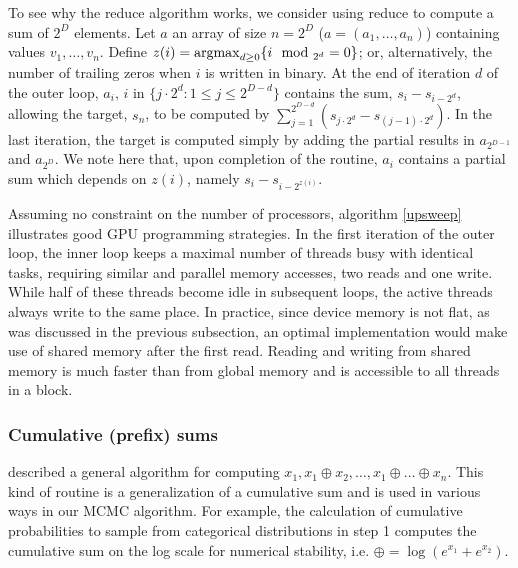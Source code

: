 To see why the reduce algorithm works, we consider using reduce to compute a sum of $2^D$ elements. Let $a$ an array of size $n=2^D$ ($a=(a_1,\ldots,a_n)$) containing values $v_1,\ldots,v_n$. Define $z(i)=\operatorname{argmax}_{d\ge 0}\{i \mod_{2^d} =0\}$; or, alternatively, the number of trailing zeros when $i$ is written in binary. At the end of iteration $d$ of the outer loop, $a_{i},\,i$ in $\{j\cdot 2^d: 1 \le j \le 2^{D-d}\}$ contains the sum, $s_{i}-s_{i-2^d}$, allowing the target, $s_n$, to be computed by $\sum_{j=1}^{2^{D-d}}(s_{j\cdot 2^d}-s_{(j-1)\cdot 2^d})$. In the last iteration, the target is computed simply by adding the partial results in $a_{2^{D-1}}$ and $a_{2^{D}}$. We note here that, upon completion of the routine, $a_i$ contains a partial sum which depends on $z(i)$, namely $s_i - s_{i-2^{z(i)}}$.

Assuming no constraint on the number of processors, algorithm \ref{upsweep} illustrates good GPU programming strategies. In the first iteration of the outer loop, the inner loop keeps a maximal number of threads busy with identical tasks, requiring similar and parallel memory accesses, two reads and one write. While half of these threads become idle in subsequent loops, the active threads always write to the same place. In practice, since device memory is not flat, as was discussed in the previous subsection, an optimal implementation would make use of shared memory after the first read. Reading and writing from shared memory is much faster than from global memory and is accessible to all threads in a block.




\subsubsection{Cumulative (prefix) sums}
\citet{blelloch1990} described a general algorithm for computing $x_1,
x_1 \oplus x_2, \ldots, x_1 \oplus \ldots \oplus x_n$. This kind of routine is a generalization of a cumulative sum and is used in various ways in our MCMC algorithm. For example, the calculation of cumulative probabilities to sample from categorical distributions in step 1 computes the cumulative sum on the log scale for numerical stability, i.e. $\oplus=\log(e^{x_1}+e^{x_2})$.

